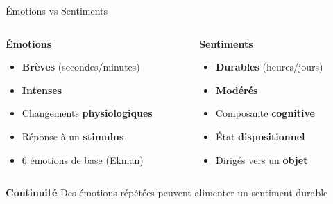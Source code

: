 \begin{frame}{Émotions vs Sentiments}
    \begin{columns}
        \begin{column}{0.48\textwidth}
            \begin{block}{\centering \textbf{Émotions}}
                \begin{itemize}
                    \setlength\itemsep{0.4em}
                    \item \textbf{Brèves} (secondes/minutes)
                    \item \textbf{Intenses}
                    \item Changements \textbf{physiologiques}
                    \item Réponse à un \textbf{stimulus}
                    \item 6 émotions de base (Ekman)
                \end{itemize}
            \end{block}
        \end{column}
        \begin{column}{0.48\textwidth}
            \begin{block}{\centering \textbf{Sentiments}}
                \begin{itemize}
                    \setlength\itemsep{0.4em}
                    \item \textbf{Durables} (heures/jours)
                    \item \textbf{Modérés}
                    \item Composante \textbf{cognitive}
                    \item État \textbf{dispositionnel}
                    \item Dirigés vers un \textbf{objet}
                \end{itemize}
            \end{block}
        \end{column}
    \end{columns}
    
    \vspace{0.3cm}
    
    \begin{alertblock}{\centering \textbf{Continuité}}
        \centering
        Des émotions répétées peuvent alimenter un sentiment durable
    \end{alertblock}
\end{frame}

